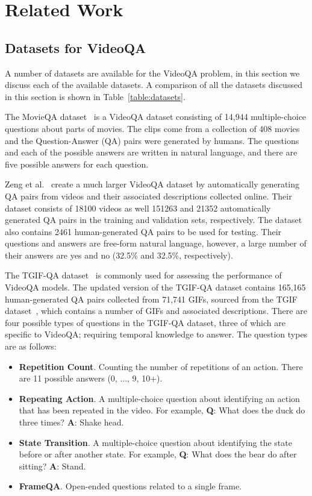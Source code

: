 \documentclass[../interim.tex]{subfiles}
\begin{document}
\section{Related Work} \label{section:related}

\subsection{Datasets for VideoQA}

A number of datasets are available for the VideoQA problem, in this section we discuss each of the available datasets. A comparison of all the datasets discussed in this section is shown in Table~\ref{table:datasets}.

The MovieQA dataset~\cite{dataset:movie-qa} is a VideoQA dataset consisting of 14,944 multiple-choice questions about parts of movies. The clips come from a collection of 408 movies and the Question-Answer (QA) pairs were generated by humans. The questions and each of the possible answers are written in natural language, and there are five possible answers for each question.

Zeng et al.~\cite{dataset:zeng} create a much larger VideoQA dataset by automatically generating QA pairs from videos and their associated descriptions collected online. Their dataset consists of 18100 videos as well 151263 and 21352 automatically generated QA pairs in the training and validation sets, respectively. The dataset also contains 2461 human-generated QA pairs to be used for testing. Their questions and answers are free-form natural language, however, a large number of their answers are yes and no (32.5\% and 32.5\%, respectively).

The TGIF-QA dataset~\cite{dataset:tgif-qa} is commonly used for assessing the performance of VideoQA models. The updated version of the TGIF-QA dataset contains 165,165 human-generated QA pairs collected from 71,741 GIFs, sourced from the TGIF dataset~\cite{dataset:tgif}, which contains a number of GIFs and associated descriptions. There are four possible types of questions in the TGIF-QA dataset, three of which are specific to VideoQA; requiring temporal knowledge to answer. The question types are as follows:
\begin{itemize}
  \item \textbf{Repetition Count}. Counting the number of repetitions of an action. There are 11 possible answers (0, ..., 9, 10+).

  \item \textbf{Repeating Action}. A multiple-choice question about identifying an action that has been repeated in the video. For example, \textbf{Q}: What does the duck do three times? \textbf{A}: Shake head.

  \item \textbf{State Transition}. A multiple-choice question about identifying the state before or after another state. For example, \textbf{Q}: What does the bear do after sitting? \textbf{A}: Stand.

  \item \textbf{FrameQA}. Open-ended questions related to a single frame.
\end{itemize}
\end{document}
